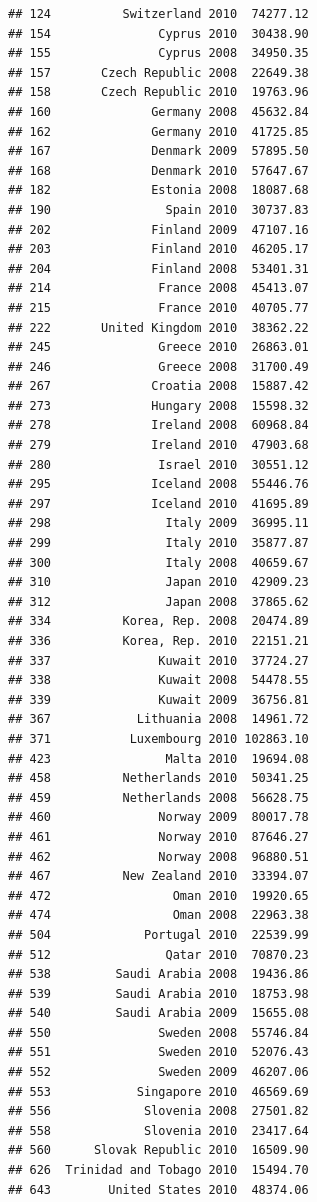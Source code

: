 \documentclass{article}\usepackage[]{graphicx}\usepackage[]{color}
\makeatletter
\newenvironment{kframe}{%
 \def\at@end@of@kframe{}%
 \ifinner\ifhmode%
  \def\at@end@of@kframe{\end{minipage}}%
  \begin{minipage}{\columnwidth}%
 \fi\fi%
 \def\FrameCommand##1{\hskip\@totalleftmargin \hskip-\fboxsep
 \colorbox{shadecolor}{##1}\hskip-\fboxsep
     \hskip-\linewidth \hskip-\@totalleftmargin \hskip\columnwidth}%
 \MakeFramed {\advance\hsize-\width
   \@totalleftmargin\z@ \linewidth\hsize
   \@setminipage}}%
 {\par\unskip\endMakeFramed%
 \at@end@of@kframe}
\newenvironment{knitrout}{}{} %
\makeatother
\begin{document}
\begin{knitrout}
\begin{kframe}
\begin{verbatim}
## 124          Switzerland 2010  74277.12
## 154               Cyprus 2010  30438.90
## 155               Cyprus 2008  34950.35
## 157       Czech Republic 2008  22649.38
## 158       Czech Republic 2010  19763.96
## 160              Germany 2008  45632.84
## 162              Germany 2010  41725.85
## 167              Denmark 2009  57895.50
## 168              Denmark 2010  57647.67
## 182              Estonia 2008  18087.68
## 190                Spain 2010  30737.83
## 202              Finland 2009  47107.16
## 203              Finland 2010  46205.17
## 204              Finland 2008  53401.31
## 214               France 2008  45413.07
## 215               France 2010  40705.77
## 222       United Kingdom 2010  38362.22
## 245               Greece 2010  26863.01
## 246               Greece 2008  31700.49
## 267              Croatia 2008  15887.42
## 273              Hungary 2008  15598.32
## 278              Ireland 2008  60968.84
## 279              Ireland 2010  47903.68
## 280               Israel 2010  30551.12
## 295              Iceland 2008  55446.76
## 297              Iceland 2010  41695.89
## 298                Italy 2009  36995.11
## 299                Italy 2010  35877.87
## 300                Italy 2008  40659.67
## 310                Japan 2010  42909.23
## 312                Japan 2008  37865.62
## 334          Korea, Rep. 2008  20474.89
## 336          Korea, Rep. 2010  22151.21
## 337               Kuwait 2010  37724.27
## 338               Kuwait 2008  54478.55
## 339               Kuwait 2009  36756.81
## 367            Lithuania 2008  14961.72
## 371           Luxembourg 2010 102863.10
## 423                Malta 2010  19694.08
## 458          Netherlands 2010  50341.25
## 459          Netherlands 2008  56628.75
## 460               Norway 2009  80017.78
## 461               Norway 2010  87646.27
## 462               Norway 2008  96880.51
## 467          New Zealand 2010  33394.07
## 472                 Oman 2010  19920.65
## 474                 Oman 2008  22963.38
## 504             Portugal 2010  22539.99
## 512                Qatar 2010  70870.23
## 538         Saudi Arabia 2008  19436.86
## 539         Saudi Arabia 2010  18753.98
## 540         Saudi Arabia 2009  15655.08
## 550               Sweden 2008  55746.84
## 551               Sweden 2010  52076.43
## 552               Sweden 2009  46207.06
## 553            Singapore 2010  46569.69
## 556             Slovenia 2008  27501.82
## 558             Slovenia 2010  23417.64
## 560      Slovak Republic 2010  16509.90
## 626  Trinidad and Tobago 2010  15494.70
## 643        United States 2010  48374.06

\end{verbatim}
\end{kframe}
\end{knitrout}
\end{document}

